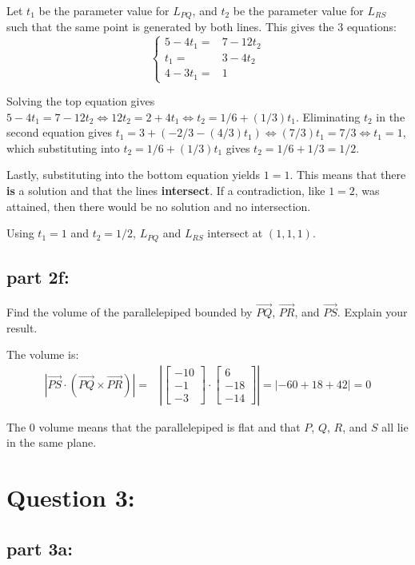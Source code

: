 \documentclass{article}
\newcommand{\abs}[1]{\left|#1\right|}
\newcommand{\colvec}[3]{\begin{bmatrix} #1 \\ #2 \\ #3 \end{bmatrix}}
\newcommand{\pvec}[1]{\overrightarrow{#1}}
\newcommand{\dr}[1]{\textcolor{dark_red}{#1}}
\begin{document}
\dr{Let \(t_1\) be the parameter value for \(L_{PQ}\), and \(t_2\) be the parameter value for \(L_{RS}\) such that the same point is generated by both lines. This gives the 3 equations: 
\[\left\{\begin{array}{rl} 5 - 4t_1 = & 7 - 12t_2 \\ t_1 = & 3 - 4t_2 \\ 4 - 3t_1 = & 1 \end{array}\right.\]}

\dr{Solving the top equation gives \(5 - 4t_1 = 7 - 12t_2 \iff 12t_2 = 2 + 4t_1 \iff t_2 = 1/6 + (1/3)t_1\). Eliminating \(t_2\) in the second equation gives \(t_1 = 3 + (-2/3 - (4/3)t_1) \iff (7/3)t_1 = 7/3 \iff t_1 = 1\), which substituting into \(t_2 = 1/6 + (1/3)t_1\) gives \(t_2 = 1/6 + 1/3 = 1/2\).}

\dr{Lastly, substituting into the bottom equation yields \(1 = 1\). This means that there \textbf{is} a solution and that the lines \textbf{intersect}. If a contradiction, like \(1 = 2\), was attained, then there would be no solution and no intersection.}

\dr{Using \(t_1 = 1\) and \(t_2 = 1/2\), \(L_{PQ}\) and \(L_{RS}\) intersect at \((1,1,1)\).}


\subsection*{part 2f:}

Find the volume of the parallelepiped bounded by \(\pvec{PQ}\), \(\pvec{PR}\), and \(\pvec{PS}\). Explain your result.

\dr{The volume is:
\begin{align*}
\abs{\pvec{PS} \cdot (\pvec{PQ} \times \pvec{PR})} 
= & \abs{\colvec{-10}{-1}{-3} \cdot \colvec{6}{-18}{-14}} 
= \abs{-60 + 18 + 42} 
= 0
\end{align*}}

\dr{The 0 volume means that the parallelepiped is flat and that \(P\), \(Q\), \(R\), and \(S\) all lie in the same plane.}



\section*{Question 3:}

\subsection*{part 3a:}
\end{document}
